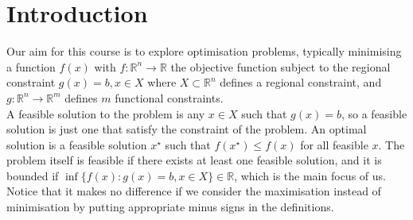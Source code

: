 \section{Introduction}
Our aim for this course is to explore optimisation problems, typically minimising a function $f(x)$ with $f:\mathbb R^n\to\mathbb R$ the objective function subject to the regional constraint $g(x)=b,x\in X$ where $X\subset\mathbb R^n$ defines a regional constraint, and $g:\mathbb R^n\to\mathbb R^m$ defines $m$ functional constraints.\\
A feasible solution to the problem is any $x\in X$ such that $g(x)=b$, so a feasible solution is just one that satisfy the constraint of the problem.
An optimal solution is a feasible solution $x^\star$ such that $f(x^\star)\le f(x)$ for all feasible $x$.
The problem itself is feasible if there exists at least one feasible solution, and it is bounded if $\inf\{f(x):g(x)=b,x\in X\}\in\mathbb R$, which is the main focus of us.\\
Notice that it makes no difference if we consider the maximisation instead of minimisation by putting appropriate minus signs in the definitions.